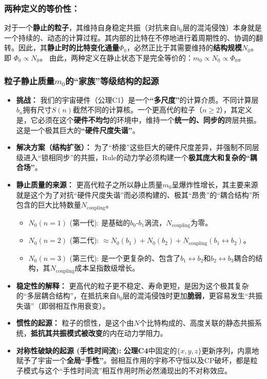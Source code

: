 \documentclass[11pt, a4paper]{article}
\begin{document}
\subsubsection*{两种定义的等价性：}
对于一个\textbf{静止的粒子}，其维持自身稳定共振（对抗来自$b_0$层的混沌侵蚀）本身就是一个持续的、动态的计算过程。其内部的比特在不停地进行着周期性的、协调的翻转。因此，其\textbf{静止时的比特变化通量$\Phi_0$}，必然正比于其需要维持的\textbf{结构规模$N_0$}。即 $\Phi_0 \propto N_0$。
由此，两种定义在静止状态下是完全等价的：\textbf{$m_0 \propto N_0 \propto \Phi_0$}。

\subsubsection*{粒子静止质量$m_0$的“家族”等级结构的起源}

\begin{itemize}
    \item \textbf{挑战：} 我们的宇宙硬件（公理C1）是一个\textbf{“多尺度”}的计算介质。不同计算层$b_n$拥有尺寸$S(n)$截然不同的计算核。一个更高代的粒子（$n \ge 2$），其定义是，它必须在这个\textbf{硬件不均匀}的环境中，维持一个\textbf{统一的、同步的}跨层共振。这是一个极其巨大的\textbf{“硬件尺度失谐”}。

    \item \textbf{解决方案（结构扩张）：} 为了“桥接”这些巨大的硬件尺度差异，并强制不同层级进入“锁相同步”的共振，Rule的动力学必须构建一个\textbf{极其庞大和复杂的“耦合场”}。

    \item \textbf{静止质量的来源：} 更高代粒子之所以静止质量$m_0$呈爆炸性增长，其主要来源就是这个为了对抗“硬件尺度失谐”而必须构建的、极其“昂贵”的“耦合结构”所包含的巨大比特数量$N_{\text{coupling}}$。
    \begin{itemize}
        \item $N_0(n=1)$ (第一代): 是基础的$b_0$-$b_1$涡流，$N_{\text{coupling}}$为零。
        \item $N_0(n=2)$ (第二代): $\approx N_0(b_1) + N_0(b_2) + N_{\text{coupling}}(b_1 \leftrightarrow b_2)$。
        \item $N_0(n=3)$ (第三代): 是一个更复杂的、包含了$b_1 \leftrightarrow b_2$和$b_2 \leftrightarrow b_3$耦合的结构，其$N_{\text{coupling}}$成本呈指数级增长。
    \end{itemize}

    \item \textbf{稳定性的解释：} 更高代的粒子更不稳定、寿命更短，是因为这个极其复杂的“多层耦合结构”，在抵抗来自$b_0$层的混沌侵蚀时更加\textbf{脆弱}，更容易发生“共振失谐”（即弱相互作用衰变）。

    \item \textbf{惯性的起源：} 粒子的惯性，是这个由$N$个比特构成的、高度关联的静态共振系统，\textbf{抵抗其共振模式被改变}的内在动力学阻力。

    \item \textbf{对称性破缺的起源 (手性时间流):} \textbf{公理C4}中固定的$\{x, y, z\}$更新序列，内禀地赋予了宇宙一个\textbf{全局“手性”}。弱相互作用的宇称不守恒以及CP破坏，都是粒子模式与这个“手性时间流”相互作用时所必然涌现出的不对称效应。
\end{itemize}
\end{document}
